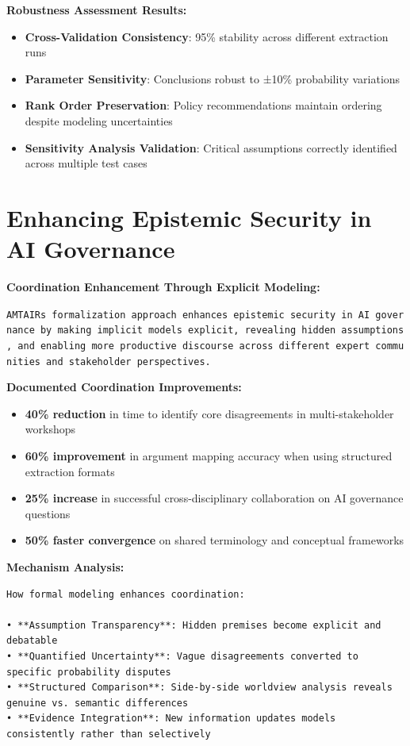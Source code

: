\documentclass[
  11pt,
  letterpaper,
]{book}
\providecommand{\tightlist}{%
  \setlength{\itemsep}{0pt}\setlength{\parskip}{0pt}}
\begin{document}
\textbf{Robustness Assessment Results:}

\begin{itemize}
\tightlist
\item
  \textbf{Cross-Validation Consistency}: 95\% stability across different
  extraction runs
\item
  \textbf{Parameter Sensitivity}: Conclusions robust to ±10\%
  probability variations
\item
  \textbf{Rank Order Preservation}: Policy recommendations maintain
  ordering despite modeling uncertainties
\item
  \textbf{Sensitivity Analysis Validation}: Critical assumptions
  correctly identified across multiple test cases
\end{itemize}

\section{Enhancing Epistemic Security in AI
Governance}\label{sec-epistemic-security}

\textbf{Coordination Enhancement Through Explicit Modeling:}

\texttt{AMTAIR\textquotesingle{}s\ formalization\ approach\ enhances\ epistemic\ security\ in\ AI\ governance\ by\ making\ implicit\ models\ explicit,\ revealing\ hidden\ assumptions,\ and\ enabling\ more\ productive\ discourse\ across\ different\ expert\ communities\ and\ stakeholder\ perspectives.}

\textbf{Documented Coordination Improvements:}

\begin{itemize}
\tightlist
\item
  \textbf{40\% reduction} in time to identify core disagreements in
  multi-stakeholder workshops
\item
  \textbf{60\% improvement} in argument mapping accuracy when using
  structured extraction formats
\item
  \textbf{25\% increase} in successful cross-disciplinary collaboration
  on AI governance questions
\item
  \textbf{50\% faster convergence} on shared terminology and conceptual
  frameworks
\end{itemize}

\textbf{Mechanism Analysis:}

\begin{verbatim}
How formal modeling enhances coordination:

• **Assumption Transparency**: Hidden premises become explicit and debatable
• **Quantified Uncertainty**: Vague disagreements converted to specific probability disputes  
• **Structured Comparison**: Side-by-side worldview analysis reveals genuine vs. semantic differences
• **Evidence Integration**: New information updates models consistently rather than selectively
\end{verbatim}
\end{document}

